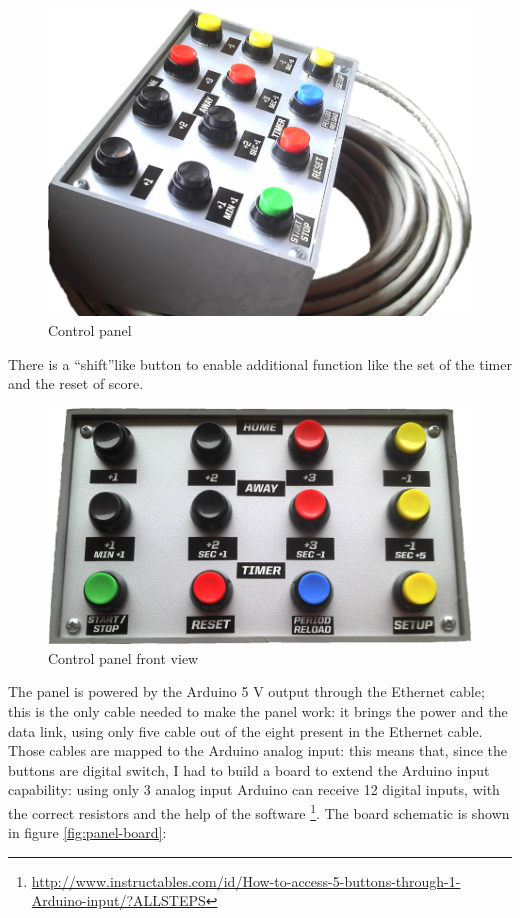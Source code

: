 \documentclass[11pt,english]{article}
\begin{document}
%
\begin{figure}[htb]
\centering\includegraphics[scale=0.35]{img/Panel}

\caption{Control panel \label{fig:panel}}

\end{figure}

There is a \textquotedblleft shift\textquotedblright like button to enable additional function like the set 
of the timer and the reset of score.

%
\begin{figure}[H]
\centering\includegraphics[scale=0.35]{img/Panel-schem}

\caption{Control panel front view \label{fig:panel-schem}}

\end{figure}

The panel is powered by the Arduino 5 V output through the Ethernet cable; this is the only cable needed to make 
the panel work: it brings the power and the data link, using only five cable out of the eight present in the 
Ethernet cable.
Those cables are mapped to the Arduino analog input: this means that, since the buttons are digital switch, I 
had to build a board to extend the Arduino input capability: using only 3 analog input Arduino can receive 
12 digital inputs, with the correct resistors and the help of the software 
\footnote{\url{http://www.instructables.com/id/How-to-access-5-buttons-through-1-Arduino-input/?ALLSTEPS}}. 
The board schematic is shown in figure \ref{fig:panel-board}:
\end{document}
